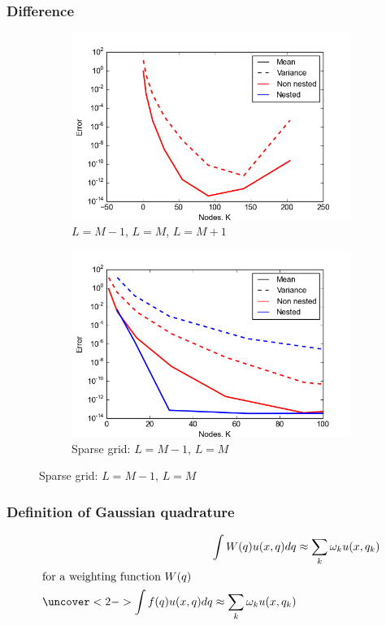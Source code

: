 \documentclass{beamer}
\begin{document}
  \begin{frame}
 \frametitle{Difference }
 \begin{figure}        
 \begin{subfigure}[b]{0.5\textwidth}
                \includegraphics[width=\textwidth]{convergence_2D_L.png}
                \caption{$L=M-1$, $L=M$, $L=M+1$}
        \end{subfigure}%
 \begin{subfigure}[b]{0.5\textwidth}
                \includegraphics[width=\textwidth]{convergence_2D_L_sparse.png}
                \caption{Sparse grid: $L=M-1$, $L=M$}
        \end{subfigure}
        \end{figure}
\end{frame}
  
  
  
 \begin{frame}
  \frametitle{Definition of Gaussian quadrature}
  \begin{align*}
   \int W(q)u(x,q)dq &\approx \sum_k \omega_k u(x,q_k)\\
   \intertext{for a weighting function $W(q)$}
   \uncover<2-> {\int f(q)u(x,q)dq \approx \sum_k \omega_k u(x,q_k)}
    \end{align*}
   \end{frame}
\end{document}
